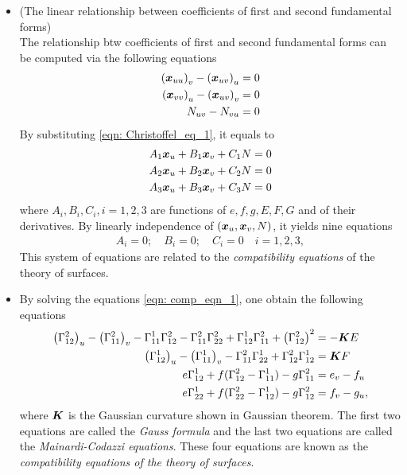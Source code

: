 \documentclass[11pt]{article}
\begin{document}
\begin{itemize}
\item (The linear relationship between coefficients of first and second fundamental forms)\\
The relationship btw coefficients of first and second fundamental forms can be computed via the following equations
\begin{align}
\left(\boldsymbol{x}_{uu}\right)_{v} - \left(\boldsymbol{x}_{uv}\right)_{u} = 0\nonumber\\
\left(\boldsymbol{x}_{vv}\right)_{u} - \left(\boldsymbol{x}_{uv}\right)_{v} = 0\nonumber\\
N_{uv} - N_{vu} = 0\label{eqn: coeff_12_fund_relation_1}
\end{align}
By substituting \eqref{eqn: Christoffel_eq_1}, it equals to 
\begin{align}
A_{1}\boldsymbol{x}_{u} + B_{1}\boldsymbol{x}_{v} + C_{1}N = 0\nonumber\\
A_{2}\boldsymbol{x}_{u} + B_{2}\boldsymbol{x}_{v} + C_{2}N = 0\nonumber\\
A_{3}\boldsymbol{x}_{u} + B_{3}\boldsymbol{x}_{v} + C_{3}N = 0\label{eqn: coeff_12_fund_relation_2} 
\end{align}
where $A_{i}, B_{i}, C_{i}, i=1,2,3$ are functions of $e,f,g,E,F,G$ and of their derivatives. By linearly independence of $(\boldsymbol{x}_{u}, \boldsymbol{x}_{v}, N)$, it yields nine equations
\begin{align}
A_{i} =0; \quad B_{i} = 0; \quad C_{i}=0 \quad i=1,2,3,  \label{eqn: comp_eqn_1}
\end{align} This system of equations are related to the \emph{compatibility equations} of the theory of surfaces. 

\item By solving the equations \eqref{eqn: comp_eqn_1}, one obtain the following equations
\begin{align}
\left(\Gamma_{12}^{2}\right)_{u}- \left(\Gamma_{11}^{2}\right)_{v} - \Gamma_{11}^{1}\Gamma_{12}^{2} - \Gamma_{11}^{2}\Gamma_{22}^{2} + \Gamma_{12}^{1}\Gamma_{11}^{2} +\left(\Gamma_{12}^{2}\right)^{2}
&= -\boldsymbol{K}E \nonumber\\
\left(\Gamma_{12}^{1}\right)_{u}-\left(\Gamma_{11}^{1}\right)_{v} -   \Gamma_{11}^{2}\Gamma_{22}^{1}  + \Gamma_{12}^{2}\Gamma_{12}^{1}
&= \boldsymbol{K}F \nonumber\\
 e\Gamma_{12}^{1} + f(\Gamma_{12}^{2} - \Gamma_{11}^{1}) - g\Gamma_{11}^{2}&= e_{v} - f_{u}  \nonumber\\
 e\Gamma_{22}^{1} + f(\Gamma_{22}^{2} - \Gamma_{12}^{1}) - g\Gamma_{12}^{2}&= f_{v} - g_{u},  \label{eqn: comp_eqn_surface_formula}
\end{align} 
where $\boldsymbol{K}$ is the Gaussian curvature shown in Gaussian theorem. The first two equations are called the \emph{Gauss formula} and the last two equations are called the \emph{Mainardi-Codazzi equations}.  These four equations are known as the \emph{compatibility equations of the theory of surfaces}. 
\end{itemize}
\end{document}
